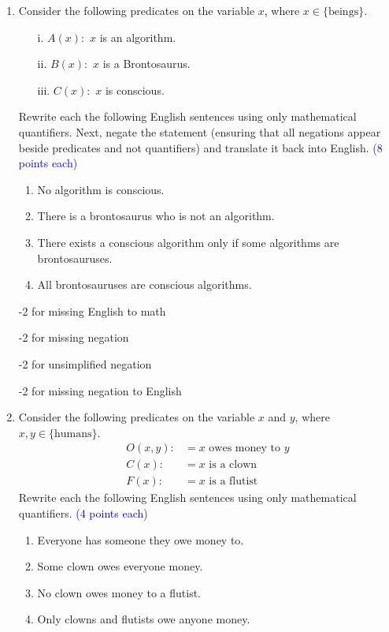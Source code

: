 \documentclass{article}
\newcommand{\pte}[1]{\textcolor{blue}{(#1 points each)}}
\newenvironment{rubric}
{
\par
\begin{spacing}{.6}
\begin{itshape}
\color{red}

}
{
\end{itshape}
\end{spacing}
\par
}
\begin{document}
\begin{enumerate}
    \item Consider the following predicates on the variable $x$, where $x \in \{\text{beings}\}.$
    \begin{enumerate}
        \item[i.] $A(x):$ $x$ is an algorithm.
        \item[ii.] $B(x):$ $x$ is a Brontosaurus.
        \item[iii.] $C(x):$ $x$ is conscious.
    \end{enumerate}
    Rewrite each the following English sentences using only mathematical quantifiers. Next, negate the statement (ensuring that all negations appear beside predicates and not quantifiers) and translate it back into English. \pte 8
    
    \begin{enumerate}
        \item No algorithm is conscious.
        
        \item There is a brontosaurus who is not an algorithm.
        
        \item There exists a conscious algorithm only if some algorithms are brontosauruses.
        
        \item All brontosauruses are conscious algorithms.
    \end{enumerate}
    
    \begin{rubric}
    -2 for missing English to math
    
    -2 for missing negation
    
    -2 for unsimplified negation
    
    -2 for missing negation to English
    \end{rubric}
    
    \item Consider the following predicates on the variable $x$ and $y$, where $x,y \in \{\text{humans}\}$.
    \begin{align*}
        O(x,y) :&= \text{$x$ owes money to $y$}\\
        C(x) :&= \text{$x$ is a clown}\\
        F(x) :&= \text{$x$ is a flutist}
    \end{align*}
    Rewrite each the following English sentences using only mathematical quantifiers. \pte 4
    \begin{enumerate}
        \item Everyone has someone they owe money to.
        \item Some clown owes everyone money.
        \item No clown owes money to a flutist.
        \item Only clowns and flutists owe anyone money.
    \end{enumerate}
    

\end{enumerate}
\end{document}
